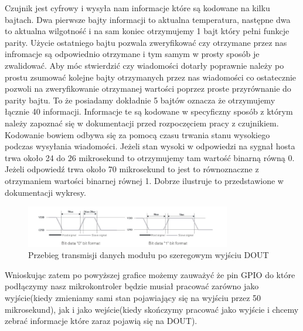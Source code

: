 \documentclass[11pt, a4paper]{article}
\begin{document}
Czujnik jest cyfrowy i wysyła nam informacje które są kodowane na kilku bajtach. Dwa pierwsze bajty informacji to aktualna temperatura, następne dwa to aktualna wilgotność i na sam koniec otrzymujemy 1 bajt który pełni funkcje parity. Użycie ostatniego bajtu pozwala zweryfikować czy otrzymane przez nas infromacje są odpowiednio otrzymane i tym samym w prosty sposób je zwalidować. Aby móc stwierdzić czy wiadomości dotarły poprawnie należy po prostu zsumować kolejne bajty otrzymanych przez nas wiadomości co ostatecznie pozwoli na zweryfikowanie otrzymanej wartości poprzez proste przyrównanie do parity bajtu. To że posiadamy dokładnie 5 bajtów oznacza że otrzymujemy łącznie 40 informacji. Informacje te są kodowane w specyficzny sposób z którym należy zapoznać się w dokumentacji przed rozpoczęciem pracy z czujnikiem. Kodowanie bowiem odbywa się za pomocą czasu trwania stanu wysokiego podczas wysyłania wiadomości. Jeżeli stan wysoki w odpowiedzi na sygnał hosta trwa około 24 do 26 mikrosekund to otrzymujemy tam wartość binarną równą 0. Jeżeli odpowiedź trwa około 70 mikrosekund to jest to równoznaczne z otrzymaniem wartości binarnej równej 1. Dobrze ilustruje to przedstawione w dokumentacji wykresy.
\begin{figure}[H]
    \centering
    \includegraphics[width=0.8\textwidth]{fig/DHT11/zasada_dzialania/Transmisjadanych.png}
    \caption{Przebieg transmisji danych modułu po szeregowym wyjściu DOUT}
    \label{fig:fig1}
\end{figure}
Wnioskując zatem po powyższej grafice możemy zauważyć że pin GPIO do które podłączymy nasz mikrokontroler będzie musiał pracować zarówno jako wyjście(kiedy zmieniamy sami stan pojawiający się na wyjściu przez 50 mikrosekund), jak i jako wejście(kiedy skończymy pracować jako wyjście i chcemy zebrać informacje które zaraz pojawią się na DOUT).


\newpage
\end{document}
